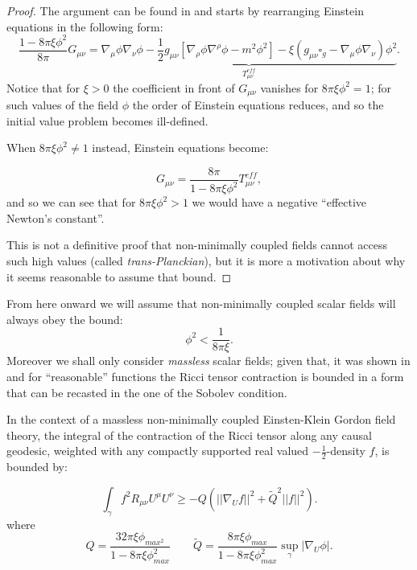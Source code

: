 \begin{proof}
    The argument can be found in \cite*{kontou2020energy} and starts by rearranging Einstein equations in the following form:
    \[
      \frac{1 - 8\pi\xi\phi^2}{8\pi}G_{\mu\nu} =  \underbrace{\nabla_{\mu}\phi\nabla_{\nu}\phi - \frac{1}{2}g_{\mu\nu}\left[\nabla_{\rho}\phi\nabla^{\rho}\phi - m^2\phi^2\right] - \xi\left(g_{\mu\nu}\square_g - \nabla_{\mu}\phi\nabla_{\nu}\right)\phi^2}_{T^{eff}_{\mu\nu}}.
    \]
    Notice that for \(\xi > 0\) the coefficient in front of \(G_{\mu\nu}\) vanishes for \(8\pi\xi\phi^2 = 1\); for such values of the field \(\phi\) the order of Einstein equations reduces, and so the initial value problem becomes ill-defined.

    When \(8\pi\xi\phi^2 \neq 1\) instead, Einstein equations become:

    \[
        G_{\mu\nu} = \frac{8\pi}{1 - 8\pi\xi\phi^2}T^{eff}_{\mu\nu},
    \]
    and so we can see that for \(8\pi\xi\phi^2 > 1\) we would have a negative ``effective Newton's constant''. 

    This is not a definitive proof that non-minimally coupled fields cannot access such high values (called \emph{trans-Planckian}), but it is more a motivation about why it seems reasonable to assume that bound. 
\end{proof}

From here onward we will assume that non-minimally coupled scalar fields will always obey the bound:
\[
\phi^2 < \frac{1}{8\pi\xi}.    
\]
Moreover we shall only consider \emph{massless} scalar fields; given that, it was shown in \cite{fewster2011singularity} and \cite{brown2018singularity} for ``reasonable'' functions the Ricci tensor contraction is bounded in a form that can be recasted in the one of the Sobolev condition.

\begin{prop}
    In the context of a massless non-minimally coupled Einsten-Klein Gordon field theory, the integral of the contraction of the Ricci tensor along any causal geodesic, weighted with any compactly supported real valued \(-\frac{1}{2}\)-density \(f\), is bounded by:

    \begin{equation}
        \int_{\gamma}f^2 R_{\mu\nu}U^{\mu}U^{\nu} \ge -Q\left(\vert\vert\nabla_U f \vert\vert^2 + \tilde{Q}^2 \vert\vert f\vert\vert^2\right).
    \end{equation}
    where 
    \[
    Q = \frac{32\pi\xi\phi_{max^2}}{1 - 8\pi\xi\phi_{max}
    ^2}
    \quad\quad
    \tilde{Q} = \frac{8\pi\xi\phi_{max}}{1 - 8\pi\xi\phi_{max}
    ^2}\sup_{\gamma}\vert \nabla_U\phi\vert.
    \]
\end{prop}

